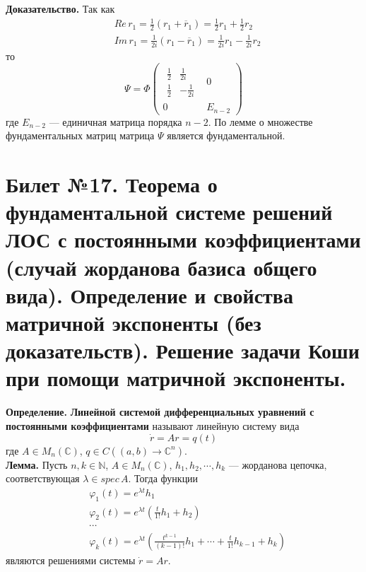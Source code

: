 \documentclass{article}
\begin{document}
\noindent \textbf{Доказательство.} Так как
\begin{equation*}
    \begin{aligned}
        &Re\, r_1 = \frac{1}{2}(r_1 + \overline{r}_1) = \frac{1}{2}r_1 + \frac{1}{2}r_2\\
        &Im\,r_1 = \frac{1}{2i}(r_1 - \overline{r}_1) = \frac{1}{2i}r_1 - \frac{1}{2i}r_2
    \end{aligned}
\end{equation*}
то
\begin{equation*}
    \Psi = \Phi \begin{pmatrix}
    \begin{matrix}
    \frac{1}{2} & \frac{1}{2i}\\
    \frac{1}{2} & -\frac{1}{2i}
    \end{matrix} & 0\\
    0 & E_{n-2}
    \end{pmatrix}
\end{equation*}
где $E_{n-2}$ --- единичная матрица порядка $n - 2$. По лемме о множестве фундаментальных матриц матрица $\Psi$ является фундаментальной.

\section{Билет №17. Теорема о фундаментальной системе решений ЛОС с постоянными коэффициентами (случай жорданова базиса общего вида). Определение и свойства матричной экспоненты (без доказательств). Решение задачи Коши при помощи матричной экспоненты.}
\textbf{Определение.} \textbf{Линейной системой дифференциальных уравнений с постоянными коэффициентами} называют линейную систему вида
\begin{equation}
    \dot{r} = Ar = q(t) \label{linpost}
\end{equation}
где $A \in M_n(\mathbb{C})$, $q \in C((a,b) \to \mathbb{C}^n)$.\\

\noindent \textbf{Лемма.} Пусть $n, k \in \mathbb{N}$, $A \in M_n(\mathbb{C})$, $h_1, h_2, \cdots, h_k$ --- жорданова цепочка, соответствующая $\lambda \in spec\, A$. Тогда функции
\begin{equation*}
    \begin{aligned}
        &\varphi_1(t) = e^{\lambda t}h_1\\
        &\varphi_2(t) = e^{\lambda t}\left(\frac{t}{1!}h_1 + h_2\right)\\
        &\cdots\\
        &\varphi_k(t) = e^{\lambda t}\left(\frac{t^{k-1}}{(k-1)!}h_1 + \cdots + \frac{t}{1!}h_{k-1} + h_k\right)
    \end{aligned}
\end{equation*}
являются решениями системы $\dot{r} = Ar$.\\
\end{document}
